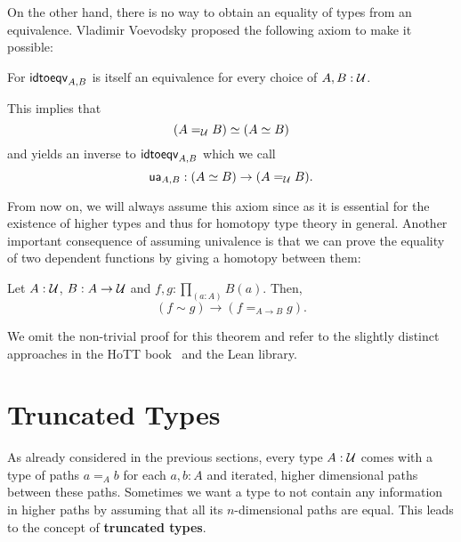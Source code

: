 On the other hand, there is no way to obtain an equality of types from an equivalence.
Vladimir Voevodsky proposed the following axiom to make it possible:
\begin{axiom}[Univalence]
For $\mathsf{idtoeqv}_{A, B}$ is itself an equivalence for every choice of $A, B : \mathcal{U}$.

This implies that
\begin{equation*}
(A =_{\mathcal{U}} B) \simeq (A \simeq B)
\end{equation*}
and yields an inverse to $\mathsf{idtoeqv}_{A, B}$ which we call
\begin{equation*}
\mathsf{ua}_{A, B} : (A \simeq B) \to (A =_{\mathcal{U}} B) \text{.}
\end{equation*}
\end{axiom}

From now on, we will always assume this axiom since as it is essential for the existence
of higher types and thus for homotopy type theory in general.
Another important consequence of assuming univalence is that we can prove
the equality of two dependent functions by giving a homotopy between them:
\begin{thm} \label{thm:funext-hott}
Let $A : \mathcal{U}$, $B : A \to \mathcal{U}$ and $f, g : \prod_{(a : A)} B(a)$. Then,
\begin{equation*}
(f \sim g) \to (f =_{A \to B} g) \text{.}
\end{equation*}
\end{thm}
We omit the non-trivial proof for this theorem and refer to the slightly distinct
approaches in the HoTT book~\cite{hottbook} and the Lean library.

\section{Truncated Types}

As already considered in the previous sections, every type $A : \mathcal{U}$ comes with
a type of paths $a =_A b$ for each $a, b : A$ and iterated, higher dimensional
paths between these paths.
Sometimes we want a type to not contain any information in higher paths by assuming
that all its $n$-dimensional paths are equal.
This leads to the concept of \textbf{truncated types}.

